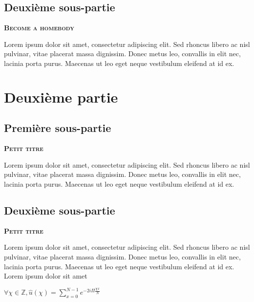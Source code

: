 \documentclass{article}
\begin{document}
\begin{center}
    \cite{einstein}

\end{center}


\subsection{Deuxième sous-partie}
\textbf{\textsc{Become a homebody}}

Lorem ipsum dolor sit amet, consectetur adipiscing elit. Sed rhoncus libero ac nisl pulvinar,
vitae placerat massa dignissim. Donec metus leo, convallis in elit nec, lacinia porta purus.
Maecenas ut leo eget neque vestibulum eleifend at id ex.

\section{Deuxième partie}

\subsection{Première sous-partie}
\textbf{\textsc{Petit titre}}

Lorem ipsum dolor sit amet, consectetur adipiscing elit. Sed rhoncus libero ac nisl pulvinar,
vitae placerat massa dignissim. Donec metus leo, convallis in elit nec, lacinia porta purus.
Maecenas ut leo eget neque vestibulum eleifend at id ex.

\subsection{Deuxième sous-partie}
\textbf{\textsc{Petit titre}}

Lorem ipsum dolor sit amet, consectetur adipiscing elit. Sed rhoncus libero ac nisl pulvinar,
vitae placerat massa dignissim. Donec metus leo, convallis in elit nec, lacinia porta purus.
Maecenas ut leo eget neque vestibulum eleifend at id ex. \newline\newline
Lorem ipsum dolor sit amet\newline


$\forall \chi \in \mathbb{Z}, \hat{u}(\chi) = \sum_{x=0}^{N-1} e^{-2i\Pi\frac{\chi x}{N}}$

% 


\end{document}
